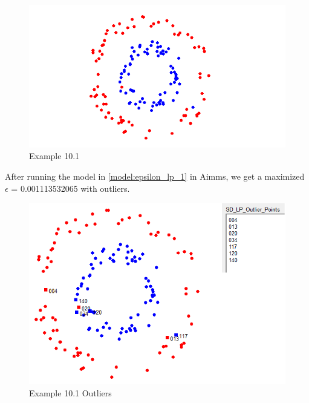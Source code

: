 \documentclass[]{article}
\begin{document}
\begin{figure}[htbp]
\begin{center}
\includegraphics[scale=0.7]{Example_10_1_Origin.PNG}
\caption{Example 10.1}
\label{fig:Example_10_1_Origin}
\end{center}
\end{figure}

After running the model in \eqref{model:epsilon_lp_1} in Aimms, we get a maximized $\epsilon$ =  0.001113532065 with outliers. 

\begin{figure}[htbp]
\begin{center}
\includegraphics[scale=0.7]{Example_10_1_outliers_1.PNG}
\caption{Example 10.1 Outliers}
\label{fig:Example_10_1_outliers_1}
\end{center}
\end{figure}
\end{document}
